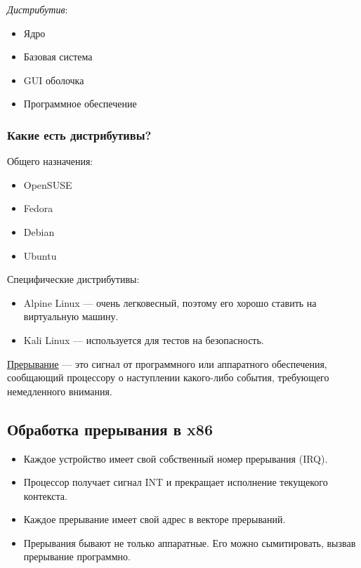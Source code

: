 \begin{multicols}{2}
      \textit{Дистрибутив}:
      \begin{itemize}
        \item Ядро
        \item Базовая система
        \item GUI оболочка
        \item Программное обеспечение 
      \end{itemize}

      \subsubsection*{Какие есть дистрибутивы?} 

      Общего назначения:
      \begin{itemize}
        \item OpenSUSE
        \item Fedora
        \item Debian
        \item Ubuntu
      \end{itemize}

      Специфические дистрибутивы:
      \begin{itemize}
        \item Alpine Linux --- очень легковесный, поэтому его
        хорошо ставить на виртуальную машину.
        \item Kali Linux --- используется для тестов на безопасность.
      \end{itemize}
      \begin{definition}{}{}
        \underline{Прерывание} --- это сигнал от программного или аппаратного обеспечения,
        сообщающий процессору о наступлении какого-либо события, требующего немедленного внимания.
      \end{definition}
      
      \subsection*{Обработка прерывания в x86}
      
      \begin{itemize}
        \item Каждое устройство имеет свой собственный номер прерывания (IRQ).
        \item Процессор получает сигнал INT и прекращает исполнение текущекого контекста.
        \item Каждое прерывание имеет свой адрес в векторе прерываний.
        \item Прерывания бывают не только аппаратные. Его можно сымитировать, 
        вызвав прерывание программно.
      \end{itemize}
      

\end{multicols}
